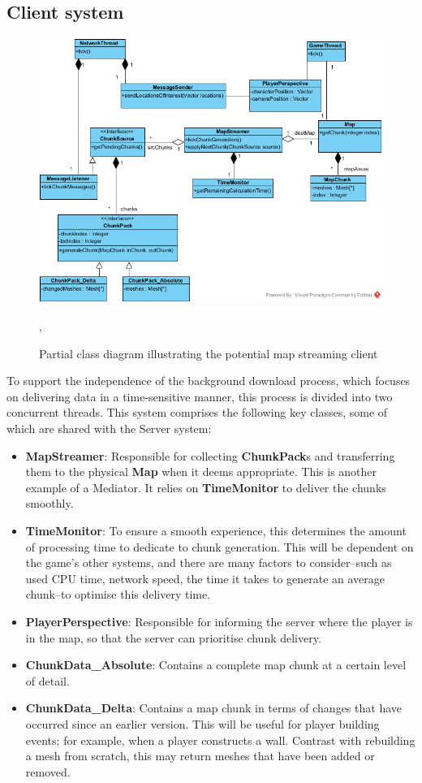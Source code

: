 \documentclass{scrartcl}
\begin{document}
\subsection{Client system}
\begin{figure}[H]
	\centering
	\includegraphics[width=0.7\linewidth]{Client_Side_Streamer.png}
	\caption{Partial class diagram illustrating the potential map streaming client},
	\label{fig:clientsystem}
\end{figure}

To support the independence of the background download process, which focuses on delivering data in a time-sensitive manner, this process is divided into two concurrent threads. This system comprises the following key classes, some of which are shared with the Server system:

\begin{itemize}
\item \textbf{MapStreamer}: Responsible for collecting \textbf{ChunkPack}s and transferring them to the physical \textbf{Map} when it deems appropriate. This is another example of a Mediator. It relies on \textbf{TimeMonitor} to deliver the chunks smoothly.
\item \textbf{TimeMonitor}: To ensure a smooth experience, this determines the amount of processing time to dedicate to chunk generation. This will be dependent on the game's other systems, and there are many factors to consider--such as used CPU time, network speed, the time it takes to generate an average chunk--to optimise this delivery time.
\item \textbf{PlayerPerspective}: Responsible for informing the server where the player is in the map, so that the server can prioritise chunk delivery.
\item \textbf{ChunkData\_Absolute}: Contains a complete map chunk at a certain level of detail.
\item \textbf{ChunkData\_Delta}: Contains a map chunk in terms of changes that have occurred since an earlier version. This will be useful for player building events; for example, when a player constructs a wall. Contrast with rebuilding a mesh from scratch, this may return meshes that have been added or removed.
\end{itemize}
\end{document}
